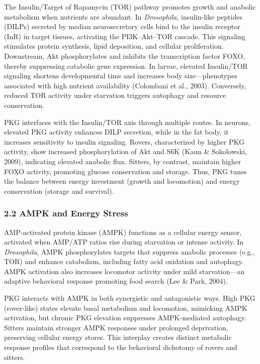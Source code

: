 \documentclass[11pt]{article}
\begin{document}
The Insulin/Target of Rapamycin (TOR) pathway promotes growth and anabolic metabolism when nutrients are abundant. In \emph{Drosophila}, insulin-like peptides (DILPs) secreted by median neurosecretory cells bind to the insulin receptor (InR) in target tissues, activating the PI3K--Akt--TOR cascade. This signaling stimulates protein synthesis, lipid deposition, and cellular proliferation. Downstream, Akt phosphorylates and inhibits the transcription factor FOXO, thereby suppressing catabolic gene expression. In larvae, elevated Insulin/TOR signaling shortens developmental time and increases body size---phenotypes associated with high nutrient availability (Colombani et al., 2003). Conversely, reduced TOR activity under starvation triggers autophagy and resource conservation.

PKG interfaces with the Insulin/TOR axis through multiple routes. In neurons, elevated PKG activity enhances DILP secretion, while in the fat body, it increases sensitivity to insulin signaling. Rovers, characterized by higher PKG activity, show increased phosphorylation of Akt and S6K (Kaun \& Sokolowski, 2009), indicating elevated anabolic flux. Sitters, by contrast, maintain higher FOXO activity, promoting glucose conservation and storage. Thus, PKG tunes the balance between energy investment (growth and locomotion) and energy conservation (storage and survival).

\subsubsection*{2.2 AMPK and Energy Stress}

AMP-activated protein kinase (AMPK) functions as a cellular energy sensor, activated when AMP/ATP ratios rise during starvation or intense activity. In \emph{Drosophila}, AMPK phosphorylates targets that suppress anabolic processes (e.g., TOR) and enhance catabolism, including fatty acid oxidation and autophagy. AMPK activation also increases locomotor activity under mild starvation---an adaptive behavioral response promoting food search (Lee \& Park, 2004).

PKG interacts with AMPK in both synergistic and antagonistic ways. High PKG (rover-like) states elevate basal metabolism and locomotion, mimicking AMPK activation, but chronic PKG elevation suppresses AMPK-mediated autophagy. Sitters maintain stronger AMPK responses under prolonged deprivation, preserving cellular energy stores. This interplay creates distinct metabolic response profiles that correspond to the behavioral dichotomy of rovers and sitters.
\end{document}
